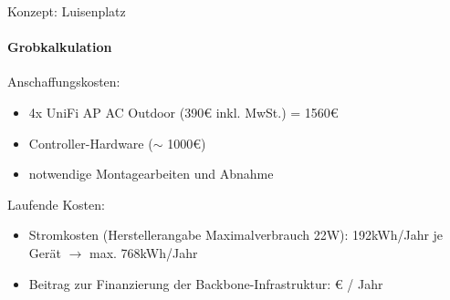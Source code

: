 \documentclass{beamer}
\begin{document}
\begin{frame}{Konzept: Luisenplatz}
\framesubtitle{Grobkalkulation}
Anschaffungskosten:
\begin{itemize}
	\item 4x UniFi AP AC Outdoor (390\euro{} inkl. MwSt.) = 1560\euro{}
	\item Controller-Hardware ($\sim$ 1000\euro{})
	\item notwendige Montagearbeiten und Abnahme
\end{itemize}
\vfill
Laufende Kosten:
\begin{itemize}
	\item Stromkosten (Herstellerangabe Maximalverbrauch 22W):\newline
	192kWh/Jahr je Gerät $\rightarrow$ max. 768kWh/Jahr
	\item Beitrag zur Finanzierung der Backbone-Infrastruktur:  \euro{} / Jahr
\end{itemize}
\end{frame}
\end{document}
